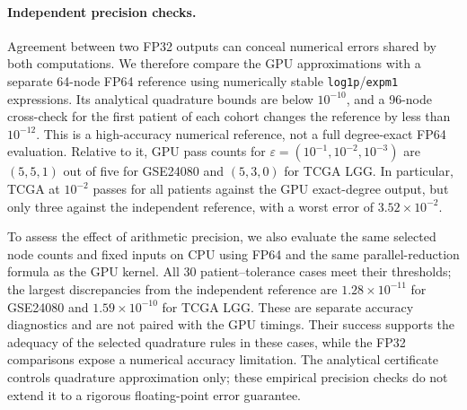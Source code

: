 \paragraph{Independent precision checks.}
Agreement between two FP32 outputs can conceal numerical errors shared
by both computations. We therefore compare the GPU approximations with
a separate 64-node FP64 reference using numerically stable
\texttt{log1p}/\texttt{expm1} expressions. Its analytical quadrature
bounds are below $10^{-10}$, and a 96-node cross-check for the first
patient of each cohort changes the reference by less than $10^{-12}$.
This is a high-accuracy numerical reference, not a full degree-exact
FP64 evaluation. Relative to it, GPU pass counts for
$\varepsilon=(10^{-1},10^{-2},10^{-3})$ are $(5,5,1)$ out of five
for GSE24080 and $(5,3,0)$ for TCGA LGG. In particular, TCGA at
$10^{-2}$ passes for all patients against the GPU exact-degree
output, but only three against the independent reference, with a worst
error of $3.52\times10^{-2}$.

To assess the effect of arithmetic precision, we also evaluate the same
selected node counts and fixed inputs on CPU using FP64 and the same
parallel-reduction formula as the GPU kernel. All 30 patient--tolerance
cases meet their thresholds; the largest discrepancies from the
independent reference are $1.28\times10^{-11}$ for GSE24080 and
$1.59\times10^{-10}$ for TCGA LGG. These are separate accuracy
diagnostics and are not paired with the GPU timings. Their success
supports the adequacy of the selected quadrature rules in these cases,
while the FP32 comparisons expose a numerical accuracy limitation.
The analytical certificate controls quadrature approximation only;
these empirical precision checks do not extend it to a rigorous
floating-point error guarantee.
